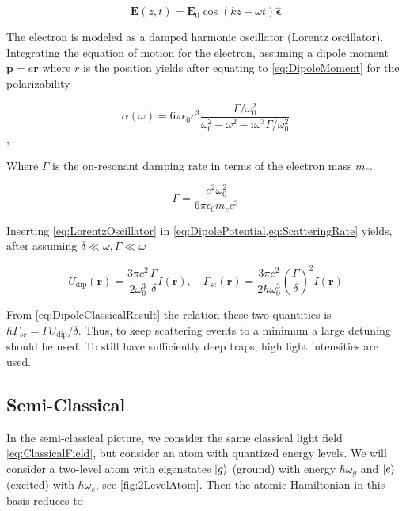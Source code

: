 \begin{equation}\label{eq:ClassicalField}
	\mathbf{E}(z,t) = \mathbf{E}_0 \cos{(k z - \omega t)} 	\bm{\hat{\epsilon}}
\end{equation}
	 
The electron is modeled as a damped harmonic oscillator (Lorentz oscillator). Integrating the equation of motion for the electron, assuming a dipole moment $\mathbf{p} = e \mathbf{r}$ where $r$ is the position yields after equating to \cref{eq:DipoleMoment} for the polarizability \cite{Grimm2000}

\begin{equation}\label{eq:LorentzOscillator}
	\alpha(\omega)=6 \pi \epsilon_{0} c^{3} \frac{\Gamma / \omega_{0}^{2}}{\omega_{0}^{2}-\omega^{2}-\mathrm{i}\omega^3\Gamma/\omega_0^2}
\end{equation},

Where $\Gamma$ is the on-resonant damping rate in terms of the electron mass $m_e$. 

\begin{equation}\label{eq:ResonantDampingRate}
	\Gamma = \frac{e^2 \omega_0^2}{6\pi \epsilon_0 m_e c^3}
\end{equation}

Inserting \cref{eq:LorentzOscillator} in \cref{eq:DipolePotential,eq:ScatteringRate} yields, after assuming $\delta \ll \omega, \Gamma \ll \omega$

\begin{equation}\label{eq:DipoleClassicalResult} 
	U_{\text{dip}}(\mathbf{r}) = 
	\frac{3\pi c^2}{2\omega_0^3}\frac{\Gamma}{\delta} I(\mathbf{r}),
	\quad
	\Gamma_{\text{sc}}(\mathbf{r}) = 
	\frac{3\pi c^2}{2\hbar\omega_0^3}\left(\frac{\Gamma}{\delta}\right)^2 I(\mathbf{r})
\end{equation}

From \cref{eq:DipoleClassicalResult} the relation these two quantities is $\hbar \Gamma_{sc} =\Gamma U_{\text{dip}}/\delta$. Thus, to keep scattering events to a minimum a large detuning should be used. To still have sufficiently deep traps, high light intensities are used. 


\subsection{Semi-Classical}

In the semi-classical picture, we consider the same classical light field \cref{eq:ClassicalField}, but consider an atom with quantized energy levels. We will consider a two-level atom with eigenstates $\lvert g\rangle$ (ground) with energy $\hbar \omega_g$ and $\lvert e\rangle$ (excited) with $\hbar \omega_e$, see \cref{fig:2LevelAtom}. Then the atomic Hamiltonian in this basis reduces to \cite{Loudon2000}

